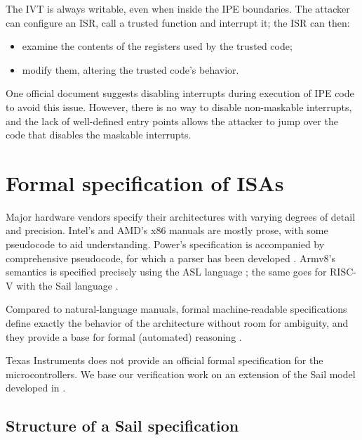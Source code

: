 The IVT is always writable, even when inside the IPE boundaries. The attacker can configure an ISR, call a trusted function and interrupt it; the ISR can then:
\begin{itemize}
\item examine the contents of the registers used by the trusted code;
\item modify them, altering the trusted code's behavior.
\end{itemize}

One official document \cite{slaa685} suggests disabling interrupts during execution of IPE code to avoid this issue. However, there is no way to disable non-maskable interrupts, and the lack of well-defined entry points allows the attacker to jump over the code that disables the maskable interrupts.



\section{Formal specification of ISAs}
\label{sec:formal-isa}

Major hardware vendors specify their architectures with varying degrees of detail and precision. Intel's \cite{Intel2025} and AMD's \cite{AMD2024} x86 manuals are mostly prose, with some pseudocode to aid understanding. Power's specification \cite{OPF2024} is accompanied by comprehensive pseudocode, for which a parser has been developed \cite{libreSOC}. Armv8's semantics is specified precisely using the ASL language \cite{Arm2020}\cite{Reid2016}; the same goes for RISC-V with the Sail language \cite{RVSail}.

Compared to natural-language manuals, formal machine-readable specifications define exactly the behavior of the architecture without room for ambiguity, and they provide a base for formal (automated) reasoning \cite{Armstrong2018}.

Texas Instruments does not provide an official formal specification for the \msp microcontrollers. We base our verification work on an extension of the \msp Sail model developed in \cite{mspthesis}.

\subsection{Structure of a Sail specification}
\label{sec:sail-structure}

